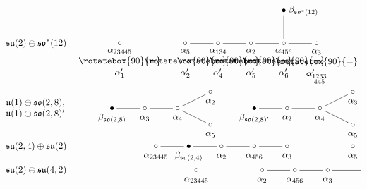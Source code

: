 \documentclass[pdftex]{sigma}
\numberwithin{equation}{section}
\begin{document}
\begin{figure}[t!]
\begin{align*}
&\mathfrak{su}(2)\oplus\mathfrak{so}^*(12) &
\xygraph{ \circ ([]!{+(0,-.6)} {\shortstack{$\alpha_{23445}$\\$\rotatebox{90}{=}$\\$\alpha_1'$}}) [r] [r]
\circ ([]!{+(0,-.6)} {\shortstack{$\alpha_5$\\$\rotatebox{90}{=}$\\$\alpha_2'$}}) - [r]
\circ ([]!{+(0,-.6)} {\shortstack{$\alpha_{134}$\\$\rotatebox{90}{=}$\\$\alpha_4'$}}) - [r]
\circ ([]!{+(0,-.6)} {\shortstack{$\alpha_2$\\$\rotatebox{90}{=}$\\$\alpha_5'$}}) - [r]
\circ ([]!{+(0,-.6)} {\shortstack{$\alpha_{456}$\\$\rotatebox{90}{=}$\\$\alpha_6'$}}) (
- [u] \bullet ([]!{+(.6,0)} {\beta_{\mathfrak{so}^*(12)}}),
- [r] \circ ([]!{+(0,-.7)} {\shortstack{$\alpha_3$\\$\rotatebox{90}{=}$\\$\alpha_{\substack{1233\\445}}'$}}))} \\[-1mm]
&\begin{matrix}\mathfrak{u}(1)\oplus\mathfrak{so}(2,8),\\ \mathfrak{u}(1)\oplus\mathfrak{so}(2,8)' \end{matrix}
&\xygraph{ \bullet ([]!{+(0,-.3)} {\beta_{\mathfrak{so}(2,8)}}) - [r]
\circ ([]!{+(0,-.3)} {\alpha_3}) - [r]
\circ ([]!{+(0,-.3)} {\alpha_4}) (
- []!{+(1,.5)} \circ ([]!{+(0,-.3)} {\alpha_2}),
- []!{+(1,-.5)} \circ ([]!{+(0,-.3)} {\alpha_5}))} \qquad
\xygraph{ \bullet ([]!{+(0,-.3)} {\beta_{\mathfrak{so}(2,8)'}}) - [r]
\circ ([]!{+(0,-.3)} {\alpha_2}) - [r]
\circ ([]!{+(0,-.3)} {\alpha_4}) (
- []!{+(1,.5)} \circ ([]!{+(0,-.3)} {\alpha_3}),
- []!{+(1,-.5)} \circ ([]!{+(0,-.3)} {\alpha_5}))} \\[-1mm]
&\mathfrak{su}(2,4)\oplus\mathfrak{su}(2) &\xygraph{ \circ ([]!{+(0,-.3)} {\alpha_{23445}}) - [r]
\bullet ([]!{+(0,-.3)} {\beta_{\mathfrak{su}(2,4)}}) - [r]
\circ ([]!{+(0,-.3)} {\alpha_2}) - [r]
\circ ([]!{+(0,-.3)} {\alpha_{456}}) - [r]
\circ ([]!{+(0,-.3)} {\alpha_3}) [r] [r]
\circ ([]!{+(0,-.3)} {\alpha_5}))} \\[-1mm]
&\mathfrak{su}(2)\oplus\mathfrak{su}(4,2) &\xygraph{ \circ ([]!{+(0,-.3)} {\alpha_{23445}}) [r] [r]
\circ ([]!{+(0,-.3)} {\alpha_2}) - [r]
\circ ([]!{+(0,-.3)} {\alpha_{456}}) - [r]
\circ ([]!{+(0,-.3)} {\alpha_3}) - [r]
}
\end{align*}
\end{figure}
\end{document}
